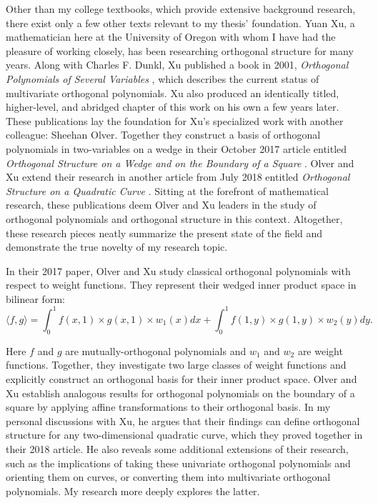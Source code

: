 \documentclass[letterpaper, 12pt]{article}
\begin{document}
Other than my college textbooks, which provide extensive background research, there exist only a few other texts relevant to my thesis' foundation. Yuan Xu, a mathematician here at the University of Oregon with whom I have had the pleasure of working closely, has been researching orthogonal structure for many years. Along with Charles F. Dunkl, Xu published a book in 2001, \textit{Orthogonal Polynomials of Several Variables} \cite{dxu}, which describes the current status of multivariate orthogonal polynomials. Xu also produced an identically titled, higher-level, and abridged chapter of this work \cite{yxu} on his own a few years later. These publications lay the foundation for Xu's specialized work with another colleague: Sheehan Olver. Together they construct a basis of orthogonal polynomials in two-variables on a wedge in their October 2017 article entitled \textit{Orthogonal Structure on a Wedge and on the Boundary of a Square} \cite{oxu1}. Olver and Xu extend their research in another article from July 2018 entitled \textit{Orthogonal Structure on a Quadratic Curve} \cite{oxu2}. Sitting at the forefront of mathematical research, these publications deem Olver and Xu leaders in the study of orthogonal polynomials and orthogonal structure in this context. Altogether, these research pieces neatly summarize the present state of the field and demonstrate the true novelty of my research topic.

In their 2017 paper, Olver and Xu study classical orthogonal polynomials with respect to weight functions. They represent their wedged inner product space in bilinear form: $$\langle f, g\rangle = \int_0^1 f(x,1)\times g(x,1)\times w_1(x) dx +  \int_0^1 f(1,y)\times g(1,y)\times w_2(y) dy.$$

\noindent Here $f$ and $g$ are mutually-orthogonal polynomials and $w_1$ and $w_2$ are weight functions. Together, they investigate two large classes of weight functions and explicitly construct an orthogonal basis for their inner product space. Olver and Xu establish analogous results for orthogonal polynomials on the boundary of a square by applying affine transformations to their orthogonal basis. In my personal discussions with Xu, he argues that their findings can define orthogonal structure for any two-dimensional quadratic curve, which they proved together in their 2018 article. He also reveals some additional extensions of their research, such as the implications of taking these univariate orthogonal polynomials and orienting them on curves, or converting them into multivariate orthogonal polynomials. My research more deeply explores the latter.
\end{document}
